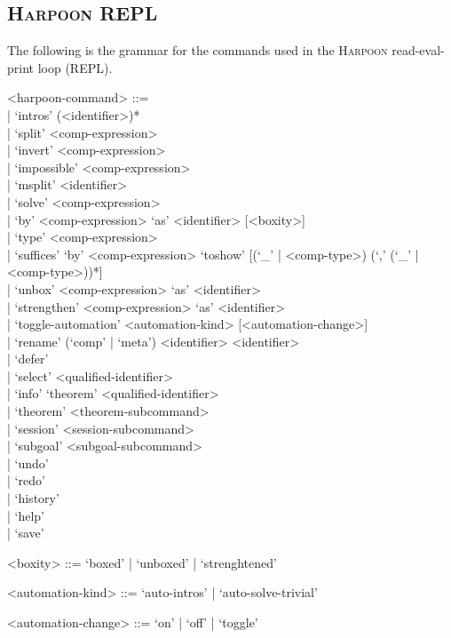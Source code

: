 \documentclass[11pt]{article}
\newcommand{\Harpoon}{\textsc{Harpoon}\xspace}
\begin{document}
\subsection{\Harpoon REPL}\label{section:syntax-harpoon-repl}

The following is the grammar for the commands used in the \Harpoon read-eval-print loop (REPL).

\begin{grammar}
<harpoon-command> ::= \hfill\\
| `intros' (<identifier>)*\\
| `split' <comp-expression>\\
| `invert' <comp-expression>\\
| `impossible' <comp-expression>\\
| `msplit' <identifier>\\
| `solve' <comp-expression>\\
| `by' <comp-expression> `as' <identifier> [<boxity>]\\
| `type' <comp-expression>\\
| `suffices' `by' <comp-expression> `toshow' [(`_' | <comp-type>) (`,' (`_' | <comp-type>))*]\\
| `unbox' <comp-expression> `as' <identifier>\\
| `strengthen' <comp-expression> `as' <identifier>\\
| `toggle-automation' <automation-kind> [<automation-change>]\\
| `rename' (`comp' | `meta') <identifier> <identifier>\\
| `defer'\\
| `select' <qualified-identifier>\\
| `info' `theorem' <qualified-identifier>\\
| `theorem' <theorem-subcommand>\\
| `session' <session-subcommand>\\
| `subgoal' <subgoal-subcommand>\\
| `undo'\\
| `redo'\\
| `history'\\
| `help'\\
| `save'

<boxity> ::=
  `boxed'
| `unboxed'
| `strenghtened'

<automation-kind> ::= `auto-intros' | `auto-solve-trivial'

<automation-change> ::= `on' | `off' | `toggle'


\end{grammar}
\end{document}
